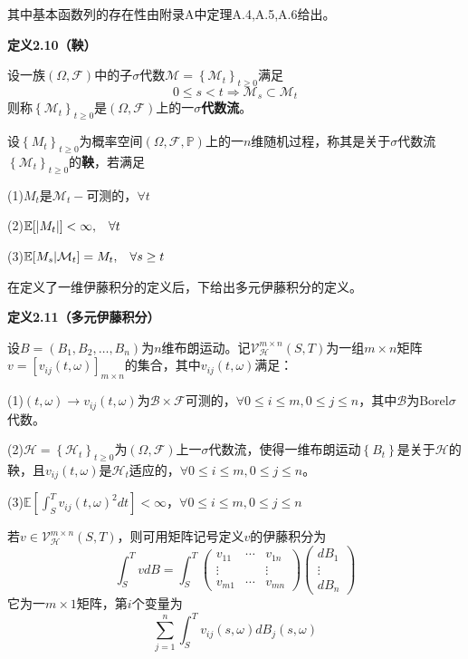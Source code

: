 \documentclass[UTF8，12pt]{ctexart}
\numberwithin{equation}{section}
\begin{document}
\noindent 其中基本函数列的存在性由附录A中定理A.4,A.5,A.6给出。

\vspace{0.3cm}
\noindent \textbf{定义2.10（鞅）}

设一族$(\Omega,\mathcal{F})$中的子$\sigma$代数$\mathcal{M}=\left\{\mathcal{M}_t\right\}_{t\ge0}$满足
\[
0\le s<t\Rightarrow\mathcal{M}_s\subset\mathcal{M}_t
\]
则称$\left\{\mathcal{M}_t\right\}_{t\ge0}$是$(\Omega,\mathcal{F})$上的一\textbf{$\sigma$代数流}。

设$\left\{M_t\right\}_{t\ge 0}$为概率空间$(\Omega,\mathcal{F},\mathbb{P})$上的一$n$维随机过程，称其是关于$\sigma$代数流$\left\{\mathcal{M}_t\right\}_{t\ge 0}$的\textbf{鞅}，若满足

\noindent(1)$M_t$是$\mathcal{M}_t-$可测的，\hspace{0.3cm}$\forall t$

\noindent(2)$\mathbb{E}[\left\vert M_t\right\vert]<\infty,\hspace{0.3cm}\forall t$

\noindent(3)$\mathbb{E}[M_s|\mathcal{M}_t]=M_t,\hspace{0.3cm}\forall s\ge t$

在定义了一维伊藤积分的定义后，下给出多元伊藤积分的定义。

\vspace{0.3cm}
\noindent \textbf{定义2.11（多元伊藤积分）}

设$B=(B_1,B_2,\ldots,B_n)$为$n$维布朗运动。记$\mathcal{V}_\mathcal{H}^{m\times n}(S,T)$为一组$m\times n$矩阵$v=[v_{ij}(t,\omega)]_{m\times n}$的集合，其中$v_{ij}(t,\omega)$满足：

\noindent (1)$(t,\omega)\to v_{ij}(t,\omega)$为$\mathcal{B}\times\mathcal{F}$可测的，$\forall 0\le i\le m,0\le j\le n$，其中$\mathcal{B}$为Borel$\sigma$代数。

\noindent (2)$\mathcal{H}=\left\{\mathcal{H}_t\right\}_{t\ge 0}$为$(\Omega,\mathcal{F})$上一$\sigma$代数流，使得一维布朗运动$\left\{B_t\right\}$是关于$\mathcal{H}$的鞅，且$v_{ij}(t,\omega)$是$\mathcal{H}_t$适应的，$\forall 0\le i\le m,0\le j\le n$。

\noindent (3)$\mathbb{E}\left[ \int_{S}^{T}v_{ij}(t,\omega)^2 dt\right]<\infty$，$\forall 0\le i\le m,0\le j\le n$

若$v\in\mathcal{V}_\mathcal{H}^{m\times n}(S,T)$，则可用矩阵记号定义$v$的伊藤积分为
\[
\int_{S}^{T}vdB=\int_{S}^{T}
\begin{pmatrix}
	v_{11} &\cdots & v_{1n} \\
	\vdots & &\vdots \\
	v_{m1} &\cdots & v_{mn}
\end{pmatrix}
\begin{pmatrix}
	dB_1 \\
	\vdots \\
	dB_n
\end{pmatrix}
\]
它为一$m\times 1$矩阵，第$i$个变量为
\[
\sum_{j=1}^{n}\int_{S}^{T}v_{ij}(s,\omega)dB_j(s,\omega)
\]
\end{document}
